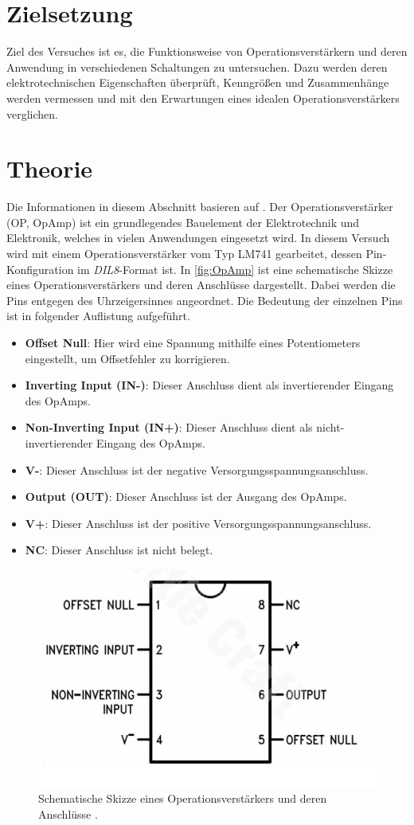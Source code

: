 \section{Zielsetzung}\label{sec:Zielsetzung}

Ziel des Versuches ist es, die Funktionsweise von Operationsverstärkern und deren Anwendung in verschiedenen Schaltungen zu untersuchen.
Dazu werden deren elektrotechnischen Eigenschaften überprüft, Kenngrößen und Zusammenhänge werden vermessen und mit den Erwartungen eines idealen Operationsverstärkers verglichen.

\section{Theorie}\label{sec:Theorie}

Die Informationen in diesem Abschnitt basieren auf \cite{Federau2017}.
Der Operationsverstärker (OP, OpAmp) ist ein grundlegendes Bauelement der Elektrotechnik und Elektronik, welches in vielen Anwendungen eingesetzt wird.
In diesem Versuch wird mit einem Operationsverstärker vom Typ LM741 gearbeitet, dessen Pin-Konfiguration im \textit{DIL8}-Format ist.
In \autoref{fig:OpAmp} ist eine schematische Skizze eines Operationsverstärkers und deren Anschlüsse dargestellt.
Dabei werden die Pins entgegen des Uhrzeigersinnes angeordnet.
Die Bedeutung der einzelnen Pins ist in folgender Auflistung aufgeführt.
\begin{itemize}
    \item \textbf{Offset Null}: Hier wird eine Spannung mithilfe eines Potentiometers eingestellt, um Offsetfehler zu korrigieren.
    \item \textbf{Inverting Input (IN-)}: Dieser Anschluss dient als invertierender Eingang des OpAmps.
    \item \textbf{Non-Inverting Input (IN+)}: Dieser Anschluss dient als nicht-invertierender Eingang des OpAmps.
    \item \textbf{V-}: Dieser Anschluss ist der negative Versorgungsspannungsanschluss.
    \item \textbf{Output (OUT)}: Dieser Anschluss ist der Ausgang des OpAmps.
    \item \textbf{V+}: Dieser Anschluss ist der positive Versorgungsspannungsanschluss.
    \item \textbf{NC}: Dieser Anschluss ist nicht belegt.
\end{itemize}
\begin{figure}[H]
	\centering
    \includegraphics[width=0.6\linewidth]{figures/LM741.png}
	\caption{Schematische Skizze eines Operationsverstärkers und deren Anschlüsse \cite{LM741}.}
	\label{fig:OpAmp}
\end{figure}\noindent
